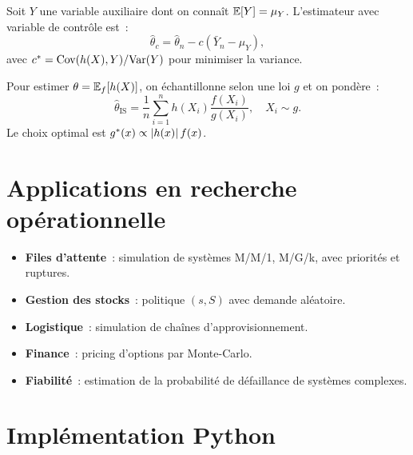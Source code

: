 \begin{definition}
Soit $Y$ une variable auxiliaire dont on conna\^it $\mathbb{E}[Y] = \mu_Y$.
L'estimateur avec variable de contr\^ole est~:
\[
  \hat{\theta}_c = \hat{\theta}_n - c(\bar{Y}_n - \mu_Y),
\]
avec $c^* = \mathrm{Cov}(h(X), Y) / \mathrm{Var}(Y)$ pour minimiser la variance.
\end{definition}

\begin{definition}
Pour estimer $\theta = \mathbb{E}_f[h(X)]$, on \'echantillonne selon une loi
$g$ et on pond\`ere~:
\[
  \hat{\theta}_{\mathrm{IS}} = \frac{1}{n} \sum_{i=1}^n h(X_i)
  \frac{f(X_i)}{g(X_i)}, \quad X_i \sim g.
\]
Le choix optimal est $g^*(x) \propto \left| h(x) \right| f(x)$.
\end{definition}

\section{Applications en recherche op\'erationnelle}

\begin{itemize}
  \item \textbf{Files d'attente}~: simulation de syst\`emes M/M/1, M/G/k,
        avec priorit\'es et ruptures.
  \item \textbf{Gestion des stocks}~: politique $(s, S)$ avec demande
        al\'eatoire.
  \item \textbf{Logistique}~: simulation de cha\^ines d'approvisionnement.
  \item \textbf{Finance}~: pricing d'options par Monte-Carlo.
  \item \textbf{Fiabilit\'e}~: estimation de la probabilit\'e de d\'efaillance
        de syst\`emes complexes.
\end{itemize}

\section{Impl\'ementation Python}


